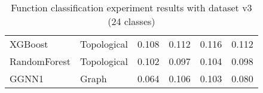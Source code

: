 \begin{table}[H]
{{\begin{tabular}{|llrrrr|}
  

  XGBoost &           Topological &     0.108 &                    0.112 &                 0.116 &     0.112 \\
  
  RandomForest &           Topological &     0.102 &                    0.097 &                 0.104 &     0.098 \\
  GGNN1 &                  Graph &     0.064 &                    0.106 &                 0.103 &     0.080 \\
  
  
                 
\hline
\end{tabular}
}
}\label{FN_exp_v3}\caption{Function classification experiment results with dataset v3 (24 classes)}
\end{table}
